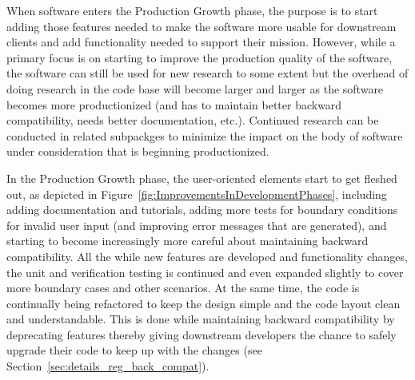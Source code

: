\documentclass[11pt]{SANDreport}
\begin{document}
\begin{floatingfigure}[r]{0.5\textwidth}
\begin{center}
\end{center}
\end{floatingfigure}

When software enters the Production Growth phase, the purpose is to
start adding those features needed to make the software more usable
for downstream clients and add functionality needed to support their
mission.  However, while a primary focus is on starting to improve the
production quality of the software, the software can still be used for
new research to some extent but the overhead of doing research in the
code base will become larger and larger as the software becomes more
productionized (and has to maintain better backward compatibility,
needs better documentation, etc.).  Continued research can be
conducted in related subpackges to minimize the impact on the body of
software under consideration that is beginning productionized.

In the Production Growth phase, the user-oriented elements start to
get fleshed out, as depicted in
Figure~\ref{fig:ImprovementsInDevelopmentPhases}, including adding
documentation and tutorials, adding more tests for boundary conditions
for invalid user input (and improving error messages that are
generated), and starting to become increasingly more careful about
maintaining backward compatibility.  All the while new features are
developed and functionality changes, the unit and verification testing
is continued and even expanded slightly to cover more boundary cases
and other scenarios.  At the same time, the code is continually being
refactored to keep the design simple and the code layout clean and
understandable.  This is done while maintaining backward compatibility
by deprecating features thereby giving downstream developers the
chance to safely upgrade their code to keep up with the changes (see
Section~\ref{sec:details_reg_back_compat}).
\end{document}
